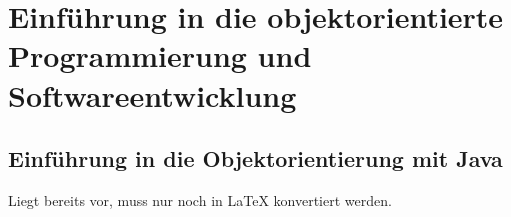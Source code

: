 \documentclass[11pt, a4paper, oneside, draft]{book}
\begin{document}
\part{Einführung in die objektorientierte Programmierung und Softwareentwicklung}

\chapter{Einführung in die Objektorientierung mit Java}
Liegt bereits vor, muss \glqq{}nur\grqq{} noch in LaTeX konvertiert werden.
%









%

\renewcommand{\indexname}{Stichwortverzeichnis}		%
\printindex
\end{document}
